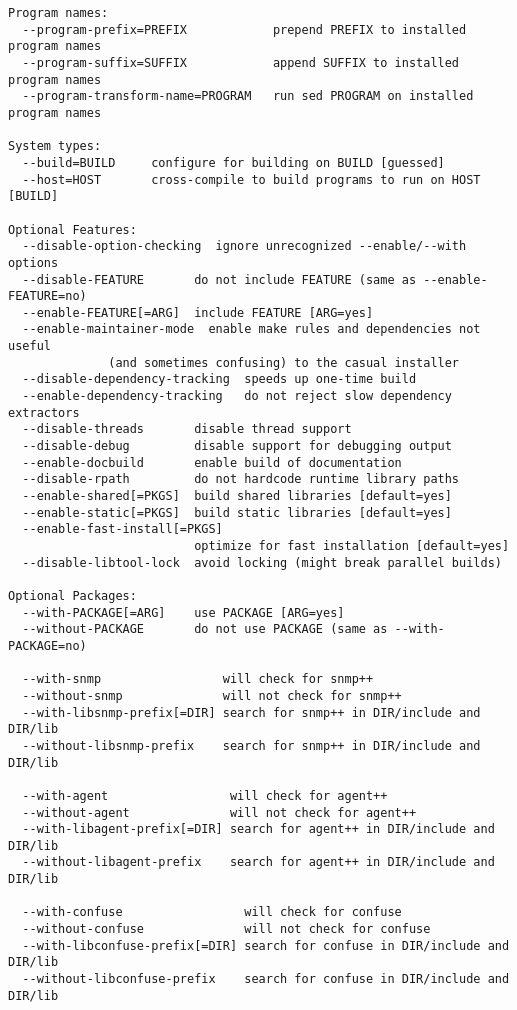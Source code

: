 \begin{verbatim}
Program names:
  --program-prefix=PREFIX            prepend PREFIX to installed program names
  --program-suffix=SUFFIX            append SUFFIX to installed program names
  --program-transform-name=PROGRAM   run sed PROGRAM on installed program names

System types:
  --build=BUILD     configure for building on BUILD [guessed]
  --host=HOST       cross-compile to build programs to run on HOST [BUILD]

Optional Features:
  --disable-option-checking  ignore unrecognized --enable/--with options
  --disable-FEATURE       do not include FEATURE (same as --enable-FEATURE=no)
  --enable-FEATURE[=ARG]  include FEATURE [ARG=yes]
  --enable-maintainer-mode  enable make rules and dependencies not useful
			  (and sometimes confusing) to the casual installer
  --disable-dependency-tracking  speeds up one-time build
  --enable-dependency-tracking   do not reject slow dependency extractors
  --disable-threads       disable thread support
  --disable-debug         disable support for debugging output
  --enable-docbuild       enable build of documentation
  --disable-rpath         do not hardcode runtime library paths
  --enable-shared[=PKGS]  build shared libraries [default=yes]
  --enable-static[=PKGS]  build static libraries [default=yes]
  --enable-fast-install[=PKGS]
                          optimize for fast installation [default=yes]
  --disable-libtool-lock  avoid locking (might break parallel builds)

Optional Packages:
  --with-PACKAGE[=ARG]    use PACKAGE [ARG=yes]
  --without-PACKAGE       do not use PACKAGE (same as --with-PACKAGE=no)

  --with-snmp                 will check for snmp++
  --without-snmp              will not check for snmp++
  --with-libsnmp-prefix[=DIR] search for snmp++ in DIR/include and DIR/lib
  --without-libsnmp-prefix    search for snmp++ in DIR/include and DIR/lib

  --with-agent                 will check for agent++
  --without-agent              will not check for agent++
  --with-libagent-prefix[=DIR] search for agent++ in DIR/include and DIR/lib
  --without-libagent-prefix    search for agent++ in DIR/include and DIR/lib

  --with-confuse                 will check for confuse
  --without-confuse              will not check for confuse
  --with-libconfuse-prefix[=DIR] search for confuse in DIR/include and DIR/lib
  --without-libconfuse-prefix    search for confuse in DIR/include and DIR/lib


\end{verbatim}
